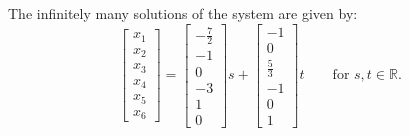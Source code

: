 \begin{SaveQuestion}
The infinitely many solutions of the system are given by:
\[
\begin{bmatrix} x_1\\x_2\\x_3\\x_4\\x_5\\x_6 \end{bmatrix} = 
\begin{bmatrix} -\frac{7}{2} \\ -1 \\ 0 \\ -3 \\ 1 \\ 0 \end{bmatrix}s +
\begin{bmatrix} -1 \\ 0 \\ \frac{5}{3} \\ -1 \\ 0 \\ 1 \end{bmatrix}t \qquad 
\mbox{for } s,t\in\mathbb{R}.
\]
 \end{SaveQuestion}


